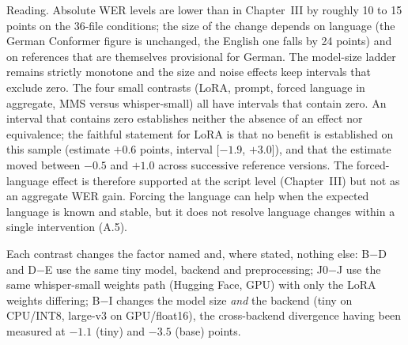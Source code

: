 Reading. Absolute WER levels are lower than in Chapter~III by roughly 10 to 15 points on the 36-file conditions;
the size of the change depends on language (the German Conformer figure is unchanged, the English one falls by
24 points) and on references that are themselves provisional for German. The model-size ladder remains strictly
monotone and the size and noise effects keep intervals that exclude zero. The four small contrasts (LoRA, prompt,
forced language in aggregate, MMS versus whisper-small) all have intervals that contain zero. An interval that
contains zero establishes neither the absence of an effect nor equivalence; the faithful statement for LoRA is
that no benefit is established on this sample (estimate $+0.6$ points, interval [$-1.9$, $+3.0$]), and that the
estimate moved between $-0.5$ and $+1.0$ across successive reference versions. The forced-language effect is
therefore supported at the script level (Chapter~III) but not as an aggregate WER gain. Forcing the language can help when the expected language is known and stable, but it does not resolve language changes within a single intervention (A.5).

Each contrast changes the factor named and, where stated, nothing else: B$-$D and D$-$E use the same tiny model,
backend and preprocessing; J0$-$J use the same whisper-small weights path (Hugging Face, GPU) with only the LoRA
weights differing; B$-$I changes the model size \emph{and} the backend (tiny on CPU/INT8, large-v3 on
GPU/float16), the cross-backend divergence having been measured at $-1.1$ (tiny) and $-3.5$ (base) points.

